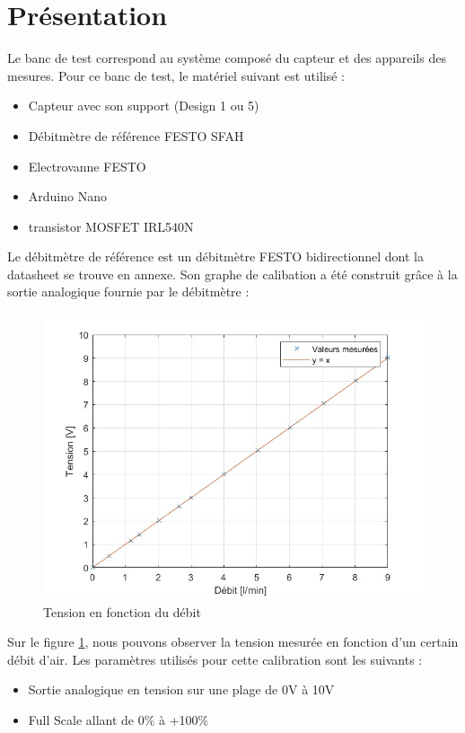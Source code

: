 
\section{Présentation}
Le banc de test correspond au système composé du capteur et des appareils des mesures. Pour ce banc de test, le matériel suivant est utilisé :
\begin{itemize}
    \item Capteur avec son support (Design 1 ou 5)
    \item Débitmètre de référence FESTO SFAH
    \item Electrovanne FESTO
    \item Arduino Nano
    \item transistor MOSFET IRL540N
\end{itemize}

Le débitmètre de référence est un débitmètre FESTO bidirectionnel dont la datasheet se trouve en annexe. Son graphe de calibation  a été
construit grâce à la sortie analogique fournie par le débitmètre :
\begin{figure}[H]
    \centering
    \includegraphics[scale = 0.4]{assets/figures/Calibration_maison.jpg}
    \caption{Tension en fonction du débit}
    \label{fig:calibration}
\end{figure}

Sur le figure \ref{fig:calibration}, nous pouvons observer la tension mesurée en fonction d'un certain débit d'air. Les paramètres utilisés
pour cette calibration sont les suivants :
\begin{itemize}
    \item Sortie analogique en tension sur une plage de 0V à 10V
    \item Full Scale allant de 0\% à +100\%
\end{itemize}


